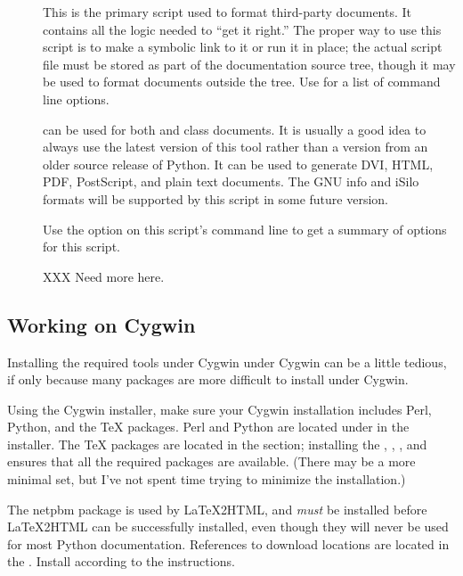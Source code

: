 \documentclass{howto}
\begin{document}
    \begin{description}
      \item[]
        This is the primary script used to format third-party
        documents.  It contains all the logic needed to ``get it
        right.''  The proper way to use this script is to make a
        symbolic link to it or run it in place; the actual script file
        must be stored as part of the documentation source tree,
        though it may be used to format documents outside the tree.
        Use   for a list of
        command line options.

         can be used for both  and
         class documents.  It is usually a good idea to
        always use the latest version of this tool rather than a
        version from an older source release of Python.  It can be
        used to generate DVI, HTML, PDF, PostScript, and plain text
        documents.  The GNU info and iSilo formats will be supported
        by this script in some future version.

        Use the  option on this script's command
        line to get a summary of options for this script.

        XXX  Need more here.
    \end{description}


  \subsection{Working on Cygwin \label{cygwin}}

    Installing the required tools under Cygwin under Cygwin can be a
    little tedious, if only because many packages are more difficult
    to install under Cygwin.

    Using the Cygwin installer, make sure your Cygwin installation
    includes Perl, Python, and the \TeX{} packages.  Perl and Python
    are located under  in the installer.
    The \TeX{} packages are located in the 
    section; installing the , ,
    , and  ensures that all the
    required packages are available.  (There may be a more minimal
    set, but I've not spent time trying to minimize the installation.)

    The netpbm package is used by \LaTeX2HTML, and \emph{must} be
    installed before \LaTeX2HTML can be successfully installed, even
    though they will never be used for most Python documentation.
    References to download locations are located in the .  Install according
    to the instructions.
\end{document}
